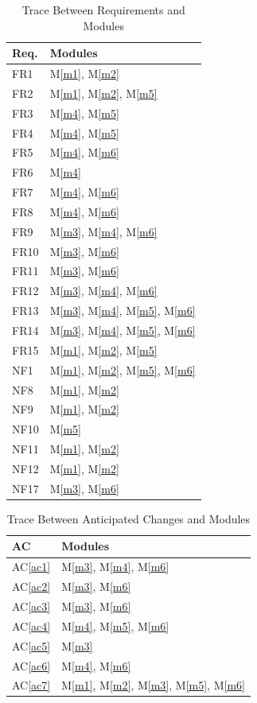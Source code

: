 \documentclass[12pt, titlepage]{article}
\newcommand{\acref}[1]{AC\ref{#1}}
\newcommand{\mref}[1]{M\ref{#1}}
\begin{document}
\begin{table}[H]
\centering
\begin{tabular}{p{} p{}}
\toprule
\textbf{Req.} & \textbf{Modules}\\
\midrule
FR1 & \mref{m1}, \mref{m2}\\
FR2 & \mref{m1}, \mref{m2}, \mref{m5}\\
FR3 & \mref{m4}, \mref{m5}\\
FR4 & \mref{m4}, \mref{m5}\\
FR5 & \mref{m4}, \mref{m6}\\
FR6 & \mref{m4}\\
FR7 & \mref{m4}, \mref{m6}\\
FR8 & \mref{m4}, \mref{m6}\\
FR9 & \mref{m3}, \mref{m4}, \mref{m6}\\
FR10 & \mref{m3}, \mref{m6}\\
FR11 & \mref{m3}, \mref{m6}\\
FR12 & \mref{m3}, \mref{m4}, \mref{m6}\\
FR13 & \mref{m3}, \mref{m4}, \mref{m5}, \mref{m6}\\
FR14 & \mref{m3}, \mref{m4}, \mref{m5}, \mref{m6}\\
FR15 & \mref{m1}, \mref{m2}, \mref{m5}\\
NF1 & \mref{m1}, \mref{m2}, \mref{m5}, \mref{m6}\\
NF8 & \mref{m1}, \mref{m2}\\
NF9 & \mref{m1}, \mref{m2}\\
NF10 & \mref{m5}\\
NF11 & \mref{m1}, \mref{m2}\\
NF12 & \mref{m1}, \mref{m2}\\
NF17 & \mref{m3}, \mref{m6}\\
\bottomrule
\end{tabular}
\caption{Trace Between Requirements and Modules}
\label{TblRT}
\end{table}

\begin{table}[H]
\centering
\begin{tabular}{p{} p{}}
\toprule
\textbf{AC} & \textbf{Modules}\\
\midrule
\acref{ac1} & \mref{m3}, \mref{m4}, \mref{m6}\\
\acref{ac2} & \mref{m3}, \mref{m6}\\
\acref{ac3} & \mref{m3}, \mref{m6}\\
\acref{ac4} & \mref{m4}, \mref{m5}, \mref{m6}\\
\acref{ac5} & \mref{m3}\\
\acref{ac6} & \mref{m4}, \mref{m6}\\
\acref{ac7} & \mref{m1}, \mref{m2}, \mref{m3}, \mref{m5}, \mref{m6}\\
\bottomrule
\end{tabular}
\caption{Trace Between Anticipated Changes and Modules}
\label{TblACT}
\end{table}
\end{document}
